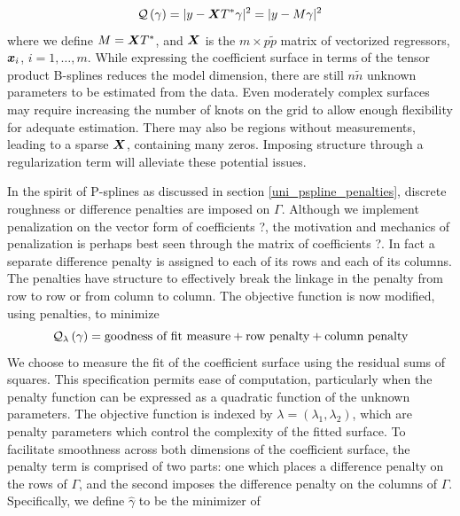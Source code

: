 \documentclass[12pt]{article}
\newcommand*\needsparaphrased{\color{red}}
\newcommand{\bfx}{\mbox{\boldmath $x$}}
\newcommand{\bfX}{\mbox{\boldmath $X$}}
\begin{document}
\begin{equation} 
\mathcal{Q}\left(\gamma\right) = \vert y - \bfX T^*\gamma \vert^2 = \vert y - M\gamma \vert^2  \label{eq:bivariate_resi_sum_of_squares}
\end{equation}
\noindent
where we define $M = \bfX T^*$, and $\bfX$ is the $m \times p\tilde{p}$ matrix of vectorized regressors, $\bfx_i$, $i=1,\dots,m$. While expressing the coefficient surface in terms of the tensor product B-splines reduces the model dimension, there are still $n\tilde{n}$ unknown parameters to be estimated from the data. Even moderately complex surfaces may require increasing the number of knots on the grid to allow enough flexibility for adequate estimation. There may also be regions without measurements, leading to a sparse $\bfX$, containing many zeros. Imposing structure through a regularization term will alleviate these potential issues.

{\needsparaphrased In the spirit of P-splines as discussed in section \ref{uni_pspline_penalties}, discrete roughness or difference penalties are imposed on $\Gamma$. Although we implement penalization on the vector form of coefficients ?, the motivation and mechanics of penalization is perhaps best seen through the matrix of coefficients ?. In fact a separate difference penalty is assigned to each of its rows and each of its columns. The penalties have structure to effectively break the linkage in the penalty from row to row or from column to column. The objective function is now modified, using penalties, to minimize }
\begin{equation} \label{eq:tensor_diff_penalty_obj_function_in_words}
\mathcal{Q}_\lambda\left(\gamma\right) = \textup{goodness of fit measure} + \textup{row penalty} + \textup{column penalty}
\end{equation}
\noindent
We choose to measure the fit of the coefficient surface using the residual sums of squares. This specification permits ease of computation, particularly when the penalty function can be expressed as a quadratic function of the unknown parameters. The objective function is indexed by $\lambda = \left(\lambda_1, \lambda_2\right)$, which are penalty parameters which control the complexity of the fitted surface. To facilitate smoothness across both dimensions of the coefficient surface, the penalty term is comprised of two parts: one which places a difference penalty on the rows of $\Gamma$, and the second imposes the difference penalty on the columns of $\Gamma$. Specifically, we define $\hat{\gamma}$ to be the minimizer of 
\end{document}
